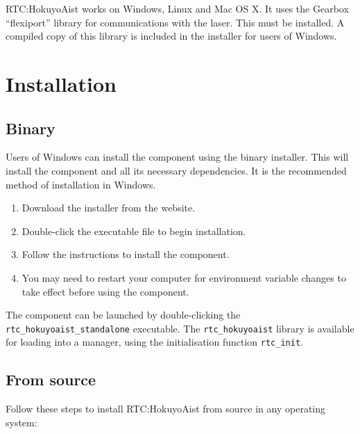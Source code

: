 \documentclass[a4paper,10pt]{article}
\begin{document}
RTC:HokuyoAist works on Windows, Linux and Mac OS X. It uses the Gearbox
``flexiport'' library for communications with the laser. This must be
installed. A compiled copy of this library is included in the installer for
users of Windows.

\section{Installation}
\label{sec:installation}

\subsection{Binary}

Users of Windows can install the component using the binary installer. This
will install the component and all its necessary dependencies. It is the
recommended method of installation in Windows.

\begin{enumerate}
  \item Download the installer from the website.
  \item Double-click the executable file to begin installation.
  \item Follow the instructions to install the component.
  \item You may need to restart your computer for environment variable changes
  to take effect before using the component.
\end{enumerate}

The component can be launched by double-clicking the
\verb|rtc_hokuyoaist_standalone| executable. The \verb|rtc_hokuyoaist| library
is available for loading into a manager, using the initialisation function
\verb|rtc_init|.

\subsection{From source}

Follow these steps to install RTC:HokuyoAist from source in any operating
system:
\end{document}
